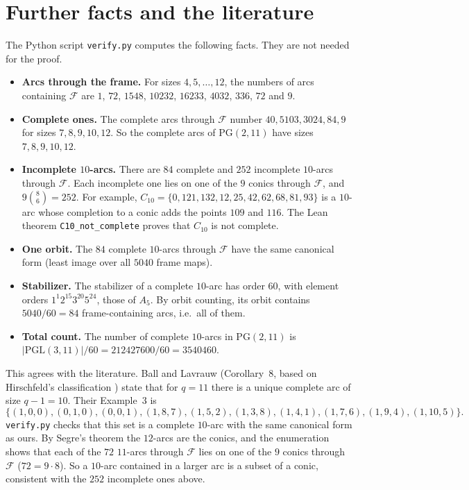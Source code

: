 \documentclass[11pt]{article}
\theoremstyle{definition}
\theoremstyle{remark}
\newcommand{\PG}{\mathrm{PG}(2,11)}
\newcommand{\PGL}{\mathrm{PGL}(3,11)}
\begin{document}
\section{Further facts and the literature}
The Python script \texttt{verify.py} computes the following facts. They are not
needed for the proof.
\begin{itemize}
\item \textbf{Arcs through the frame.} For sizes $4,5,\dots,12$, the numbers
of arcs containing $\mathcal F$ are $1$, $72$, $1548$, $10232$, $16233$,
$4032$, $336$, $72$ and $9$.
\item \textbf{Complete ones.} The complete arcs through $\mathcal F$ number
$40, 5103, 3024, 84, 9$ for sizes $7, 8, 9, 10, 12$. So the complete arcs of
$\PG$ have sizes $7,8,9,10,12$.
\item \textbf{Incomplete $10$-arcs.} There are $84$ complete and $252$
incomplete $10$-arcs through $\mathcal F$. Each incomplete one lies on one of
the $9$ conics through $\mathcal F$, and $9\binom{8}{6}=252$. For example,
$C_{10}=\{0,121,132,12,25,42,62,68,81,93\}$ is a $10$-arc whose completion to a
conic adds the points $109$ and $116$. The Lean theorem
\texttt{C10\_not\_complete} proves that $C_{10}$ is not complete.
\item \textbf{One orbit.} The $84$ complete $10$-arcs through $\mathcal F$ have
the same canonical form (least image over all $5040$ frame maps).
\item \textbf{Stabilizer.} The stabilizer of a complete $10$-arc has order $60$,
with element orders $1^1 2^{15} 3^{20} 5^{24}$, those of $A_5$. By orbit
counting, its orbit contains $5040/60=84$ frame-containing arcs, i.e.\ all of
them.
\item \textbf{Total count.} The number of complete $10$-arcs in $\PG$ is
$|\PGL|/60=212427600/60=3540460$.
\end{itemize}

This agrees with the literature. Ball and Lavrauw \cite{bl} (Corollary~8, based
on Hirschfeld's classification \cite[Table~9.4]{hir}) state that for $q=11$
there is a unique complete arc of size $q-1=10$. Their Example~3 is
\[
\{(1,0,0),(0,1,0),(0,0,1),(1,8,7),(1,5,2),(1,3,8),(1,4,1),(1,7,6),(1,9,4),(1,10,5)\}.
\]
\texttt{verify.py} checks that this set is a complete $10$-arc with the same
canonical form as ours. By Segre's theorem \cite{segre} the $12$-arcs are the
conics, and the enumeration shows that each of the $72$ $11$-arcs through
$\mathcal F$ lies on one of the $9$ conics through $\mathcal F$ ($72=9\cdot8$).
So a $10$-arc contained in a larger arc is a subset of a conic, consistent
with the $252$ incomplete ones above.
\end{document}
